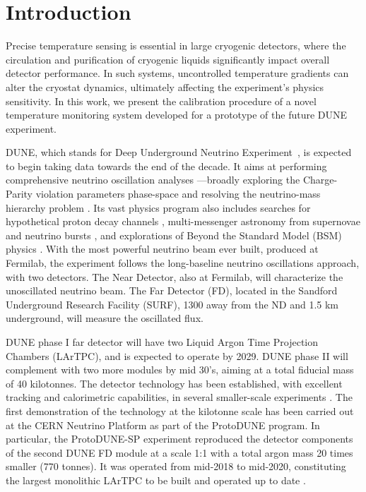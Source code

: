 \section{Introduction}
\label{sec:introduction}

\noindent Precise temperature sensing is essential in large cryogenic detectors, where the circulation and purification of cryogenic liquids significantly impact overall detector performance. In such systems, uncontrolled temperature gradients can alter the cryostat dynamics, ultimately affecting the experiment's physics sensitivity. In this work, we present the calibration procedure of a novel temperature monitoring system developed for a prototype of the future DUNE experiment.

DUNE, which stands for Deep Underground Neutrino Experiment~\cite{dune_tdr1}, is expected to begin taking data towards the end of the decade. It aims at performing comprehensive neutrino oscillation analyses ---broadly exploring the Charge-Parity violation parameters phase-space and resolving the neutrino-mass hierarchy problem \cite{bib:dune_osc}. Its vast physics program also includes searches for hypothetical proton decay channels \cite{bib:dune_tdr2}, multi-messenger astronomy from supernovae and neutrino bursts \cite{bib:dune_supernova}, and explorations of Beyond the Standard Model (BSM) physics \cite{bib:dune_bsm}. With the most powerful neutrino beam ever built, produced at Fermilab, the experiment follows the long-baseline neutrino oscillations approach, with two detectors. The Near Detector, also at Fermilab, will characterize the unoscillated neutrino beam. The Far Detector (FD), located in the Sandford Underground Research Facility (SURF), 1300 away from the ND and 1.5 km underground, will measure the oscillated flux.

DUNE phase I far detector will have two Liquid Argon Time Projection Chambers (LArTPC), and is expected to operate by 2029. DUNE phase II will complement with two more modules by mid 30's, aiming at a total fiducial mass of 40 kilotonnes. The detector technology has been established, with excellent tracking and calorimetric capabilities, in several smaller-scale experiments \cite{icarus,microboone}. The first demonstration of the technology at the kilotonne scale has been carried out at the CERN Neutrino Platform as part of the ProtoDUNE program. In particular, the ProtoDUNE-SP experiment \cite{pdsp_tdr} reproduced the detector components of the second DUNE FD module \cite{dune_tdr4} at a scale 1:1 with a total argon mass 20 times smaller (770 tonnes). It was operated from mid-2018 to mid-2020, constituting the largest monolithic LArTPC to be built and operated up to date \cite{pdsp_1,pdsp_2}.


